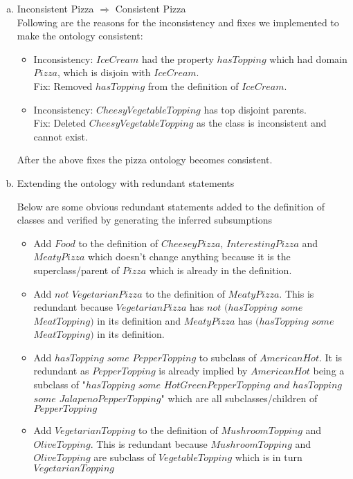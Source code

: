 \documentclass{article}
\begin{document}
\begin{enumerate}[(a)]
\begin{itemize}
\end{itemize}

\item Inconsistent Pizza $\Rightarrow$ Consistent Pizza\\

Following are the reasons for the inconsistency and fixes we implemented to make the ontology consistent: \\

\begin{itemize}
\item Inconsistency: $IceCream$ had the property $hasTopping$ which had domain $Pizza$, which is disjoin with $IceCream$. \\
Fix: Removed $hasTopping$ from the definition of $IceCream$.
\item Inconsistency: $CheesyVegetableTopping$ has top disjoint parents. \\
Fix: Deleted  $CheesyVegetableTopping$ as the class is inconsistent and cannot exist.
\end{itemize}

After the above fixes the pizza ontology becomes consistent.

\item Extending the ontology with redundant statements

Below are some obvious redundant statements added to the definition of classes and verified by generating the inferred subsumptions
\begin{itemize}
\item Add $Food$ to the definition of $CheeseyPizza$, $InterestingPizza$ and $MeatyPizza$ which doesn’t change anything because it is the superclass/parent of $Pizza$ which is already in the definition.

\item Add $not$ $VegetarianPizza$ to the definition of $MeatyPizza$. This is redundant because $VegetarianPizza$ has $not$ $(hasTopping$ $some$ $MeatTopping)$ in its definition and $MeatyPizza$ has $(hasTopping$ $some$ $MeatTopping)$ in its definition.

\item Add $hasTopping$ $some$ $PepperTopping$ to subclass of $AmericanHot$. It is redundant as $PepperTopping$ is already implied by $AmericanHot$ being a subclass of "$hasTopping$ $some$ $HotGreenPepperTopping$ $and$ $hasTopping$ $some$ $JalapenoPepperTopping$" which are all subclasses/children of $PepperTopping$

\item Add $VegetarianTopping$ to the definition of $MushroomTopping$ and $OliveTopping$. This is redundant because $MushroomTopping$ and $OliveTopping$ are subclass of $VegetableTopping$ which is in turn $VegetarianTopping$

\end{itemize}











\end{enumerate}
\end{document}
